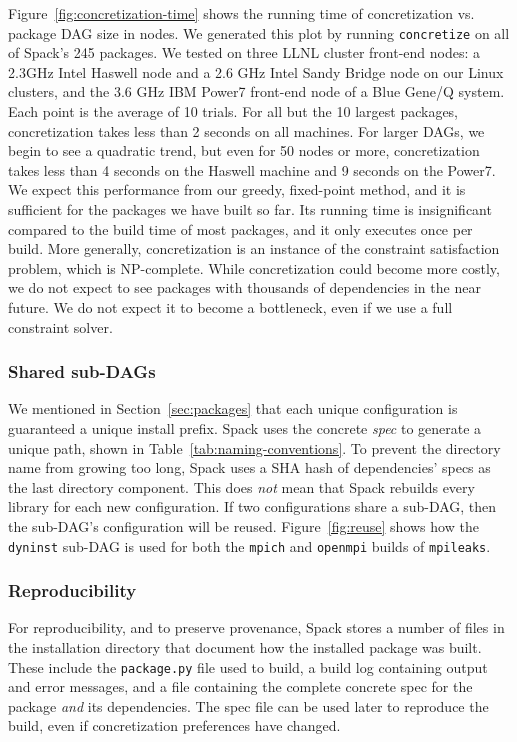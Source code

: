 Figure~\ref{fig:concretization-time} shows the running time of concretization vs.
package DAG size in nodes.  We generated this plot by running {\tt concretize}
on all of Spack's 245 packages. We tested on three LLNL cluster front-end nodes:
a 2.3GHz Intel Haswell node and a 2.6 GHz Intel Sandy Bridge node on our Linux
clusters, and the 3.6 GHz IBM Power7 front-end node of a Blue Gene/Q system.
Each point is the average of 10 trials.  For all but the 10
largest packages, concretization takes less than 2 seconds on all machines.
For larger DAGs, we begin to see a quadratic trend, but even for 50 nodes or more, 
concretization takes less than 4 seconds on the Haswell machine and 9 seconds on the 
Power7.
%
We expect this performance from our greedy, fixed-point method, and
it is sufficient for the packages we have built so far.
Its running time is insignificant compared to the build time of
most packages, and it only executes
once per build. 
More generally, concretization is an instance of the constraint
satisfaction problem, which is NP-complete. While concretization could become
more costly, we do not expect to see packages with
thousands of dependencies in the near future. We do not expect
it to become a bottleneck, even if we use a full constraint solver.

\subsubsection{Shared sub-DAGs}
\label{sec:directory-layout}

We mentioned in Section~\ref{sec:packages} that each unique configuration is
guaranteed a unique install prefix. Spack uses the concrete {\it spec}
to generate a unique path, shown in Table~\ref{tab:naming-conventions}.
To prevent the directory name from growing too long, Spack uses a SHA hash of
dependencies' specs as the last directory component.  This
does {\it not} mean that Spack rebuilds every library for each new configuration.
If two configurations share a sub-DAG, then the sub-DAG's configuration will
be reused.  Figure~\ref{fig:reuse} shows how the {\tt dyninst} sub-DAG is used for
both the {\tt mpich} and {\tt openmpi} builds of {\tt mpileaks}.


\subsubsection{Reproducibility}


For reproducibility, and to preserve provenance, Spack stores a number of
files in the installation directory that document how the installed package was
built.  These include the {\tt package.py} file used to build, a build log
containing output and error messages, and a file containing the complete
concrete spec for the package {\it and} its dependencies. The spec file can be
used later to reproduce the build, even if concretization preferences have changed.

